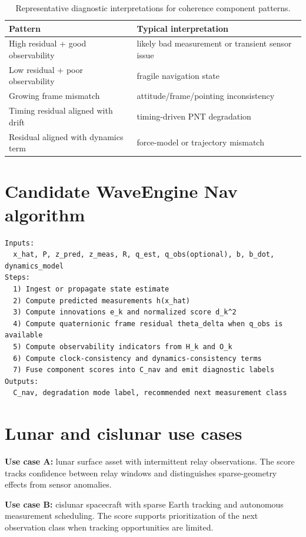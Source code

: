 \documentclass[11pt]{article}
\theoremstyle{remark}
\begin{document}
\begin{table}[h]
\centering
\begin{tabular}{@{}ll@{}}
\toprule
Pattern & Typical interpretation \\
\midrule
High residual + good observability & likely bad measurement or transient sensor issue \\
Low residual + poor observability & fragile navigation state \\
Growing frame mismatch & attitude/frame/pointing inconsistency \\
Timing residual aligned with drift & timing-driven PNT degradation \\
Residual aligned with dynamics term & force-model or trajectory mismatch \\
\bottomrule
\end{tabular}
\caption{Representative diagnostic interpretations for coherence component patterns.}
\end{table}

\section{Candidate WaveEngine Nav algorithm}

\begin{verbatim}
Inputs:
  x_hat, P, z_pred, z_meas, R, q_est, q_obs(optional), b, b_dot, dynamics_model
Steps:
  1) Ingest or propagate state estimate
  2) Compute predicted measurements h(x_hat)
  3) Compute innovations e_k and normalized score d_k^2
  4) Compute quaternionic frame residual theta_delta when q_obs is available
  5) Compute observability indicators from H_k and O_k
  6) Compute clock-consistency and dynamics-consistency terms
  7) Fuse component scores into C_nav and emit diagnostic labels
Outputs:
  C_nav, degradation mode label, recommended next measurement class
\end{verbatim}

\section{Lunar and cislunar use cases}

\textbf{Use case A:} lunar surface asset with intermittent relay observations. The score tracks confidence between relay windows and distinguishes sparse-geometry effects from sensor anomalies.

\textbf{Use case B:} cislunar spacecraft with sparse Earth tracking and autonomous measurement scheduling. The score supports prioritization of the next observation class when tracking opportunities are limited.
\end{document}
